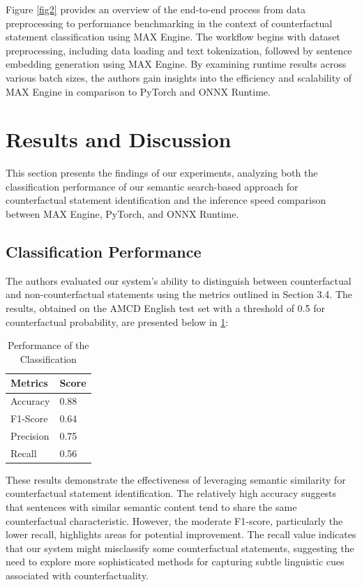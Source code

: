 \documentclass[conference]{IEEEtran}
\begin{document}
Figure \ref{fig2} provides an overview of the end-to-end process from data preprocessing to performance benchmarking in the context of counterfactual statement classification using MAX Engine. The workflow begins with dataset preprocessing, including data loading and text tokenization, followed by sentence embedding generation using MAX Engine.
By examining runtime results across various batch sizes, the authors gain insights into the efficiency and scalability of MAX Engine in comparison to PyTorch and ONNX Runtime.

\section{Results and Discussion}
This section presents the findings of our experiments, analyzing both the classification performance of our semantic search-based approach for counterfactual statement identification and the inference speed comparison between MAX Engine, PyTorch, and ONNX Runtime.

\subsection{Classification Performance}
The authors evaluated our system's ability to distinguish between counterfactual and non-counterfactual statements using the metrics outlined in Section 3.4. The results, obtained on the AMCD English test set with a threshold of 0.5 for counterfactual probability, are presented below in \ref{tab:metrics}:

\captionsetup[table]{skip=10pt}
\begin{table}[H]
    \centering
    \begin{tabular}{|l|l|}
    \hline
    \textbf{Metrics} & \textbf{Score} \\
    \hline
    Accuracy & 0.88 \\
    \hline
    F1-Score & 0.64 \\
    \hline
    Precision & 0.75 \\
    \hline
    Recall & 0.56 \\
    \hline
    \end{tabular}
    \caption{Performance of the Classification}
    \label{tab:metrics}
\end{table}

These results demonstrate the effectiveness of leveraging semantic similarity for counterfactual statement identification. The relatively high accuracy suggests that sentences with similar semantic content tend to share the same counterfactual characteristic. However, the moderate F1-score, particularly the lower recall, highlights areas for potential improvement. The recall value indicates that our system might misclassify some counterfactual statements, suggesting the need to explore more sophisticated methods for capturing subtle linguistic cues associated with counterfactuality.
\end{document}
